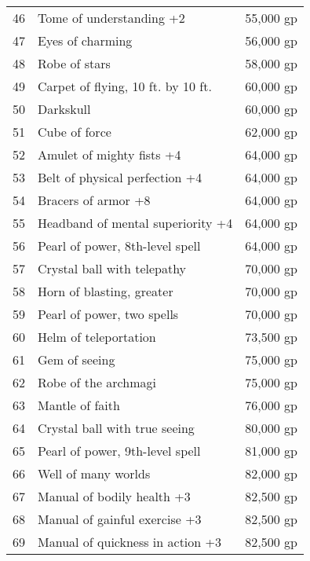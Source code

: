 \begin{table}[]
\begin{tabular}{lll}
46  & Tome of understanding +2                       & 55,000 gp    \\
47  & Eyes of charming                               & 56,000 gp    \\
48  & Robe of stars                                  & 58,000 gp    \\
49  & Carpet of flying, 10 ft. by 10 ft.             & 60,000 gp    \\
50  & Darkskull                                      & 60,000 gp    \\
51  & Cube of force                                  & 62,000 gp    \\
52  & Amulet of mighty fists +4                      & 64,000 gp    \\
53  & Belt of physical perfection +4                 & 64,000 gp    \\
54  & Bracers of armor +8                            & 64,000 gp    \\
55  & Headband of mental superiority +4              & 64,000 gp    \\
56  & Pearl of power, 8th-level spell                & 64,000 gp    \\
57  & Crystal ball with telepathy                    & 70,000 gp    \\
58  & Horn of blasting, greater                      & 70,000 gp    \\
59  & Pearl of power, two spells                     & 70,000 gp    \\
60  & Helm of teleportation                          & 73,500 gp    \\
61  & Gem of seeing                                  & 75,000 gp    \\
62  & Robe of the archmagi                           & 75,000 gp    \\
63  & Mantle of faith                                & 76,000 gp    \\
64  & Crystal ball with true seeing                  & 80,000 gp    \\
65  & Pearl of power, 9th-level spell                & 81,000 gp    \\
66  & Well of many worlds                            & 82,000 gp    \\
67  & Manual of bodily health +3                     & 82,500 gp    \\
68  & Manual of gainful exercise +3                  & 82,500 gp    \\
69  & Manual of quickness in action +3               & 82,500 gp    \\

\end{tabular}
\end{table}
